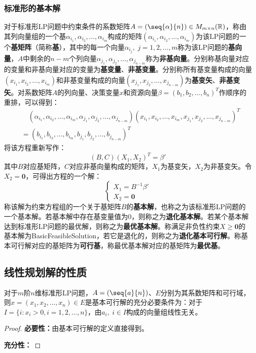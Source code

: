 \subsubsection{标准形的基本解}
\begin{definition}
	对于标准形LP问题中约束条件的系数矩阵$A=(\seq{\alpha}{n})\in M_{m\times n}(\mathbb{R})$，称由其列向量组的一个基$\alpha_{i_1},\alpha_{i_2},\dots,\alpha_{i_m}$构成的矩阵$(\alpha_{i_1},\alpha_{i_2},\dots,\alpha_{i_m})$为该LP问题的一个\textbf{基矩阵}（简称\textbf{基}），其中的每一个向量$\alpha_{i_j},\;j=1,2,\dots,m$称为该LP问题的\textbf{基向量}，$A$中剩余的$n-m$个列向量$\alpha_{j_1},\alpha_{j_2},\dots,\alpha_{j_{n-m}}$称为\textbf{非基向量}。分别称基向量对应的变量和非基向量对应的变量为\textbf{基变量}、\textbf{非基变量}。分别称所有基变量构成的向量$(x_{i_1},x_{i_2},\dots,x_{i_m})$和非基变量构成的向量$(x_{j_1},x_{j_2},\dots,x_{j_{n-m}})$为\textbf{基变矢}、\textbf{非基变矢}。对系数矩阵$A$的列向量、决策变量$x$和资源向量$\beta=(b_1,b_2,\dots,b_n)^T$作顺序的重排，可以得到：
	\begin{align*}
		&\quad(\alpha_{i_1},\alpha_{i_2},\dots,\alpha_{i_m},\alpha_{j_1},\alpha_{j_2},\dots,\alpha_{j_{n-m}})(x_{i_1},x_{i_2},\dots,x_{i_m},x_{j_1},x_{j_2},\dots,x_{j_{n-m}})^T \\
		&=(b_{i_1},b_{i_2},\dots,b_{i_m},b_{j_1},b_{j_2},\dots,b_{j_{n-m}})^T
	\end{align*}
	将该方程重新写作：
	\begin{equation*}
		(B,C)(X_1,X_2)^T=\beta'
	\end{equation*}
	其中$B$对应基矩阵，$C$对应非基向量构成的矩阵，$X_1$为基变矢，$X_2$为非基变矢。令$X_2=\mathbf{0}$，可得出方程的一个解：
	\begin{equation*}
		\begin{cases}
			X_1=B^{-1}\beta' \\
			X_2=\mathbf{0}
		\end{cases}
	\end{equation*}
	称该解为约束方程组的一个关于基矩阵$B$的\textbf{基本解}，也称之为该标准形LP问题的一个基本解。若基本解中存在基变量值为$0$，则称之为\textbf{退化基本解}。若某个基本解达到标准形LP问题的最优解，则称之为\textbf{最优基本解}。称满足非负性约束$X\geqslant\mathbf{0}$的基本解为\gls{BasicFeasibleSolution}，若它是退化的，则称之为\textbf{退化基本可行解}。称基本可行解对应的基矩阵为\textbf{可行基}，称最优基本解对应的基矩阵为\textbf{最优基}。
\end{definition}

\subsection{线性规划解的性质}
\begin{lemma}
	对于$m$阶$n$维标准形LP问题，$A=(\seq{a}{n})$、$E$分别为其系数矩阵和可行域，则$x=(x_1,x_2,\dots,x_n)\in E$是基本可行解的充分必要条件为：对于$I=\{i:x_i>0,i=1,2,\dots,n\}$，由$a_i,\;i\in I$构成的向量组线性无关。
\end{lemma}
\begin{proof}
	\textbf{必要性：}由基本可行解的定义直接得到。\par
	\textbf{充分性：}
\end{proof}

